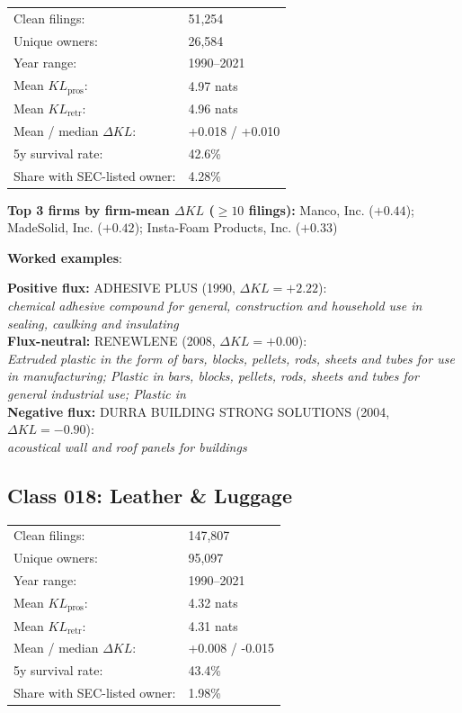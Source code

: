 \begin{tabular}{ll}
Clean filings: & 51,254 \\
Unique owners: & 26,584 \\
Year range: & 1990--2021 \\
Mean $KL_\text{pros}$: & 4.97 nats \\
Mean $KL_\text{retr}$: & 4.96 nats \\
Mean / median $\Delta KL$: & +0.018 / +0.010 \\
5y survival rate: & 42.6\% \\
Share with SEC-listed owner: & 4.28\% \\
\end{tabular}

\textbf{Top 3 firms by firm-mean $\Delta KL$ ($\geq 10$ filings):} Manco, Inc. ($+0.44$); MadeSolid, Inc. ($+0.42$); Insta-Foam Products, Inc. ($+0.33$)

\textbf{Worked examples}:

  \textbf{Positive flux:} \textsc{ADHESIVE PLUS} (1990, $\Delta KL=+2.22$):\\
  \textit{chemical adhesive compound for general, construction and household use in sealing, caulking and insulating}\\
  \textbf{Flux-neutral:} \textsc{RENEWLENE} (2008, $\Delta KL=+0.00$):\\
  \textit{Extruded plastic in the form of bars, blocks, pellets, rods, sheets and tubes for use in manufacturing; Plastic in bars, blocks, pellets, rods, sheets and tubes for general industrial use; Plastic in }\\
  \textbf{Negative flux:} \textsc{DURRA BUILDING STRONG SOLUTIONS} (2004, $\Delta KL=-0.90$):\\
  \textit{acoustical wall and roof panels for buildings}\\

\subsection*{Class 018: Leather \& Luggage}
\label{app:industry-018}

\begin{tabular}{ll}
Clean filings: & 147,807 \\
Unique owners: & 95,097 \\
Year range: & 1990--2021 \\
Mean $KL_\text{pros}$: & 4.32 nats \\
Mean $KL_\text{retr}$: & 4.31 nats \\
Mean / median $\Delta KL$: & +0.008 / -0.015 \\
5y survival rate: & 43.4\% \\
Share with SEC-listed owner: & 1.98\% \\
\end{tabular}

